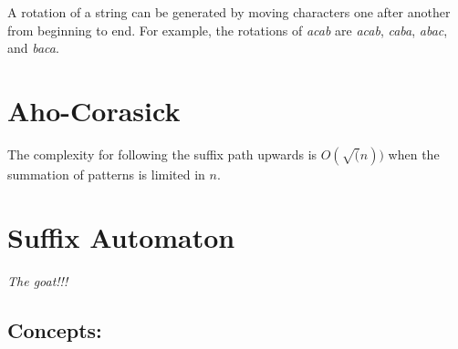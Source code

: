     A rotation of a string can be generated by moving characters one after another from beginning to end.
    For example, the rotations of \textit{acab} are \textit{acab}, \textit{caba}, \textit{abac}, and \textit{baca}.


\section{Aho-Corasick}

    The complexity for following the suffix path upwards is $O(\sqrt(n))$ when the summation of patterns is limited in $n$.



\section{Suffix Automaton}

    \textit{The goat!!!} 

    \subsection{Concepts:}

